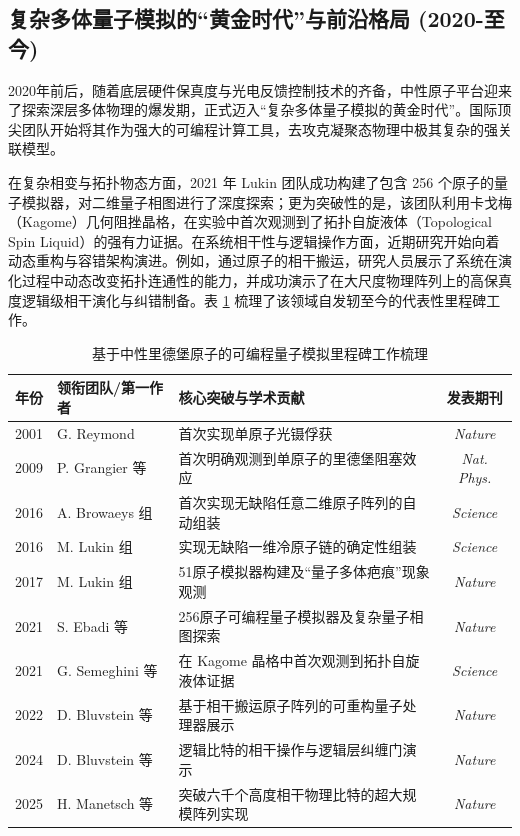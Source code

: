 \documentclass[../main.tex]{subfiles}
\begin{document}
\subsection{复杂多体量子模拟的“黄金时代”与前沿格局 (2020-至今)}
\label{ch1:subsec:status_golden}

2020年前后，随着底层硬件保真度与光电反馈控制技术的齐备，中性原子平台迎来了探索深层多体物理的爆发期，正式迈入“复杂多体量子模拟的黄金时代”。国际顶尖团队开始将其作为强大的可编程计算工具，去攻克凝聚态物理中极其复杂的强关联模型。

在复杂相变与拓扑物态方面，2021 年 Lukin 团队成功构建了包含 256 个原子的量子模拟器，对二维量子相图进行了深度探索；更为突破性的是，该团队利用卡戈梅（Kagome）几何阻挫晶格，在实验中首次观测到了拓扑自旋液体（Topological Spin Liquid）的强有力证据\cite{bluvstein2021controlling, semeghini2021probing}。在系统相干性与逻辑操作方面，近期研究开始向着动态重构与容错架构演进。例如，通过原子的相干搬运，研究人员展示了系统在演化过程中动态改变拓扑连通性的能力，并成功演示了在大尺度物理阵列上的高保真度逻辑级相干演化与纠错制备。表 \ref{chp1:tab:milestone} 梳理了该领域自发轫至今的代表性里程碑工作。

\begin{table}[htb]
\centering
\caption{基于中性里德堡原子的可编程量子模拟里程碑工作梳理}
\label{chp1:tab:milestone}
\begin{tabular}{lllc}
\toprule
年份 & 领衔团队/第一作者 & 核心突破与学术贡献 & 发表期刊 \\
\midrule
2001 & G. Reymond & 首次实现单原子光镊俘获 & \textit{Nature} \\
2009 & P. Grangier 等 & 首次明确观测到单原子的里德堡阻塞效应 & \textit{Nat. Phys.} \\
2016 & A. Browaeys 组 & 首次实现无缺陷任意二维原子阵列的自动组装 & \textit{Science} \\
2016 & M. Lukin 组 & 实现无缺陷一维冷原子链的确定性组装 & \textit{Science} \\
2017 & M. Lukin 组 & 51原子模拟器构建及“量子多体疤痕”现象观测 & \textit{Nature} \\
2021 & S. Ebadi 等 & 256原子可编程量子模拟器及复杂量子相图探索 & \textit{Nature} \\
2021 & G. Semeghini 等 & 在 Kagome 晶格中首次观测到拓扑自旋液体证据 & \textit{Science} \\
2022 & D. Bluvstein 等 & 基于相干搬运原子阵列的可重构量子处理器展示 & \textit{Nature} \\
2024 & D. Bluvstein 等 & 逻辑比特的相干操作与逻辑层纠缠门演示 & \textit{Nature} \\
2025 & H. Manetsch 等 & 突破六千个高度相干物理比特的超大规模阵列实现 & \textit{Nature} \\
\bottomrule
\end{tabular}
\end{table}
\end{document}
